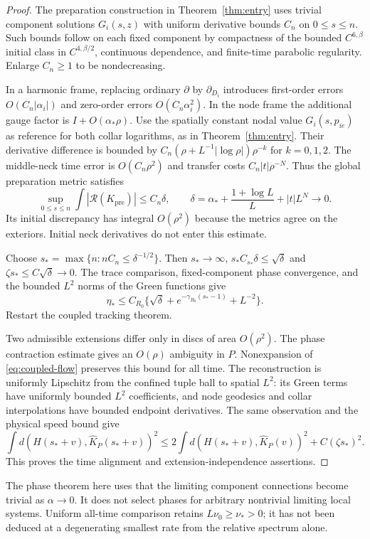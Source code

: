 \begin{proof}
The preparation construction in
Theorem~\ref{thm:entry} uses trivial
component solutions $G_i(s,z)$ with
uniform derivative bounds $C_n$ on
$0\le s\le n$. Such bounds follow
on each fixed component by compactness
of the bounded $C^{6,\beta}$ initial
class in $C^{4,\beta/2}$, continuous
dependence, and finite-time parabolic
regularity. Enlarge $C_n\ge1$ to be
nondecreasing.

In a harmonic frame, replacing ordinary
$\partial$ by $\partial_{D_i}$ introduces
first-order errors $O(C_n|\alpha_i|)$
and zero-order errors $O(C_n\alpha_i^2)$.
In the node frame the additional gauge
factor is $I+O(\alpha_*\rho)$.
Use the spatially constant nodal value
$G_i(s,p_{ie})$ as reference for both
collar logarithms, as in
Theorem~\ref{thm:entry}.
Their derivative difference is bounded
by $C_n(\rho+L^{-1}|\log\rho|)\rho^{-k}$
for $k=0,1,2$.
The middle-neck time error is
$O(C_n\rho^2)$ and transfer costs
$C_n|t|\rho^{-N}$.
Thus the global preparation metric satisfies
\[
 \sup_{0\le s\le n}\int|\mathcal R(K_{\mathrm{pre}})|
 \le C_n\delta,\qquad
 \delta=\alpha_*+\frac{1+\log L}{L}+|t|L^N\to0 .
\]
Its initial discrepancy has integral
$O(\rho^2)$ because the metrics agree
on the exteriors. Initial neck
derivatives do not enter this estimate.

Choose $s_*=\max\{n:nC_n\le\delta^{-1/2}\}$.
Then $s_*\to\infty$,
$s_*C_{s_*}\delta\le\sqrt\delta$ and
$\zeta s_*\le C\sqrt\delta\to0$.
The trace comparison, fixed-component
phase convergence, and the bounded
$L^2$ norms of the Green functions give
\[
 \eta_*\le C_{R_0}
       \{\sqrt\delta+e^{-\gamma_{R_0}(s_*-1)}+L^{-2}\}.
\]
Restart the coupled tracking theorem.

Two admissible extensions differ only
in discs of area $O(\rho^2)$.
The phase contraction estimate gives
an $O(\rho)$ ambiguity in $P$.
Nonexpansion of \eqref{eq:coupled-flow}
preserves this bound for all time.
The reconstruction is uniformly
Lipschitz from the confined tuple ball
to spatial $L^2$: its Green terms have
uniformly bounded $L^2$ coefficients,
and node geodesics and collar
interpolations have bounded endpoint
derivatives. The same observation and
the physical speed bound give
\[
 \int d(H(s_*+v),\widehat K_P(s_*+v))^2
 \le2\int d(H(s_*+v),\widehat K_P(v))^2
                                      +C(\zeta s_*)^2 .
\]
This proves the time alignment and
extension-independence assertions.
\end{proof}

The phase theorem here uses that the
limiting component connections become
trivial as $\alpha\to0$.
It does not select phases for arbitrary
nontrivial limiting local systems.
Uniform all-time comparison retains
$L\nu_0\ge\nu_*>0$; it has not been
deduced at a degenerating smallest rate
from the relative spectrum alone.
